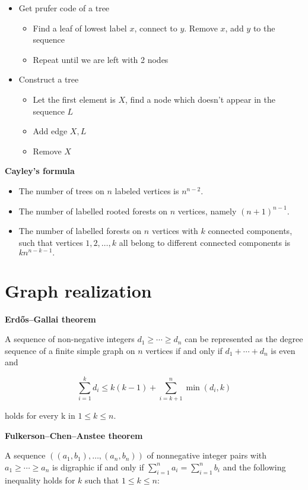 \documentclass[a4paper]{article}
\begin{document}
\begin{landscape}
\begin{multicols}{2}
\begin{itemize}
    \item Get prufer code of a tree
    \begin{itemize}
        \item Find a leaf of lowest label $x$, connect to $y$. Remove $x$, add $y$ to the sequence
        \item Repeat until we are left with 2 nodes
    \end{itemize}
    \item Construct a tree
    \begin{itemize}
        \item Let the first element is $X$, find a node which doesn't appear in the sequence $L$
        \item Add edge $X, L$
        \item Remove $X$
    \end{itemize}
\end{itemize}

\textbf{Cayley's formula}
\begin{itemize}
    \item The number of trees on $n$ labeled vertices is $n ^ {n - 2}$.
    \item The number of labelled rooted forests on $n$ vertices, namely $(n + 1)^{n - 1}$.
    \item The number of labelled forests on $n$ vertices with $k$ connected components, such that vertices $1, 2, \dots, k$ all belong to different connected components is $kn^{n-k-1}.$
\end{itemize}

\section{Graph realization}

\textbf{Erdős–Gallai theorem}

A sequence of non-negative integers $ d_{1}\geq \cdots \geq d_{n}$ can be represented as the degree sequence of a finite simple graph on $n$ vertices if and only if $d_{1}+\cdots +d_{n}$ is even and

$$\sum _{i=1}^{k}d_{i}\leq k(k-1)+\sum _{i=k+1}^{n}\min(d_{i},k)$$

holds for every k in $1\leq k\leq n$.

\textbf{Fulkerson–Chen–Anstee theorem}

A sequence $((a_{1},b_{1}),\ldots ,(a_{n},b_{n}))$ of nonnegative integer pairs with $ a_{1}\geq \cdots \geq a_{n}$ is digraphic if and only if $\sum _{i=1}^{n}a_{i}=\sum _{i=1}^{n}b_{i}$ and the following inequality holds for $k$ such that $ 1\leq k\leq n$:


\end{multicols}
\end{landscape}
\end{document}
